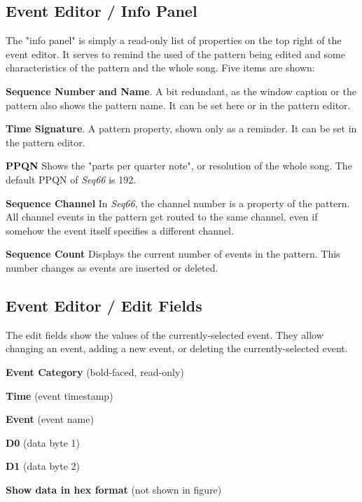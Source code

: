 \subsection{Event Editor / Info Panel}
\label{subsec:event_editor_info}

   The "info panel" is simply a read-only list of properties on the top right
   of the event editor.  It serves to remind the used of the pattern being
   edited and some characteristics of the pattern and the whole song.
   Five items are shown:

   \begin{enumber}
      \item \textbf{Sequence Number and Name}.
         A bit redundant, as the window caption or the pattern
         also shows the pattern name.
         It can be set here or in the pattern editor.
      \item \textbf{Time Signature}.
         A pattern property, shown only as a reminder.
         It can be set in the pattern editor.
      \item \textbf{PPQN}
         Shows the "parts per quarter note", or resolution of the
         whole song.  The default PPQN of \textsl{Seq66} is 192.
      \item \textbf{Sequence Channel}
         In \textsl{Seq66}, the channel number is a property of the
         pattern.  All channel events in the pattern get routed to the same
         channel, even if somehow the event itself specifies a different
         channel.
      \item \textbf{Sequence Count}
         Displays the current number of events in the pattern.
         This number changes as events are inserted or deleted.
   \end{enumber}

\subsection{Event Editor / Edit Fields}
\label{subsec:event_editor_fields}

   The edit fields show the values of the currently-selected event.  They allow
   changing an event, adding a new event, or deleting the currently-selected
   event.

   \begin{enumber}
      \item \textbf{Event Category} (bold-faced, read-only)
      \item \textbf{Time} (event timestamp)
      \item \textbf{Event} (event name)
      \item \textbf{D0} (data byte 1)
      \item \textbf{D1} (data byte 2)
      \item \textbf{Show data in hex format} (not shown in figure)
   \end{enumber}

